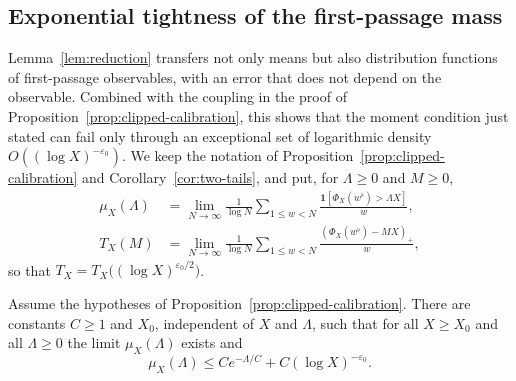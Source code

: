 \subsection*{Exponential tightness of the first-passage mass}
\label{subsec:tightness}
Lemma~\ref{lem:reduction} transfers not only means but also
distribution functions of first-passage observables, with an error that
does not depend on the observable. Combined with the coupling in the
proof of Proposition~\ref{prop:clipped-calibration}, this shows that the
moment condition just stated can fail only through an exceptional set of
logarithmic density $O((\log X)^{-\varepsilon_0})$. We keep the notation
of Proposition~\ref{prop:clipped-calibration} and
Corollary~\ref{cor:two-tails}, and put, for $\Lambda\ge0$ and $M\ge0$,
\[
 \begin{aligned}
 \mu_X(\Lambda)&=\lim_{N\to\infty}\frac1{\log N}
   \sum_{1\le w<N}\frac{\mathbf 1[\Phi_X(w^\flat)>\Lambda X]}{w},\\
 T_X(M)&=\lim_{N\to\infty}\frac1{\log N}
   \sum_{1\le w<N}\frac{(\Phi_X(w^\flat)-MX)_+}{w},
 \end{aligned}
\]
so that $T_X=T_X\bigl((\log X)^{\varepsilon_0/2}\bigr)$.

\begin{proposition}
\label{prop:tightness}
Assume the hypotheses of Proposition~\ref{prop:clipped-calibration}.
There are constants $C\ge1$ and $X_0$, independent of $X$ and $\Lambda$, such that
for all $X\ge X_0$ and all $\Lambda\ge0$ the limit $\mu_X(\Lambda)$
exists and
\begin{equation}\label{eq:tightness}
 \mu_X(\Lambda)\le C e^{-\Lambda/C}+C(\log X)^{-\varepsilon_0}.
\end{equation}
\end{proposition}

